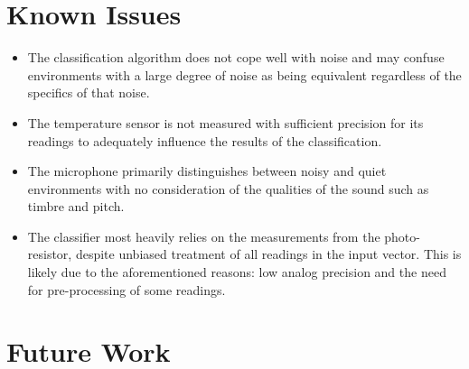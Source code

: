 \documentclass{article}
\begin{document}
\section{Known Issues}

\begin{itemize}

  \item The classification algorithm does not cope well with noise and
    may confuse environments with a large degree of noise as being
    equivalent regardless of the specifics of that noise.

  \item The temperature sensor is not measured with sufficient precision
    for its readings to adequately influence the results of the
    classification.

  \item The microphone primarily distinguishes between noisy and quiet
    environments with no consideration of the qualities of the sound
    such as timbre and pitch.

  \item The classifier most heavily relies on the measurements from the
    photo-resistor, despite unbiased treatment of all readings in the
    input vector.  This is likely due to the aforementioned reasons:
    low analog precision and the need for pre-processing of some
    readings.

\end{itemize}

\section{Future Work}
\end{document}
